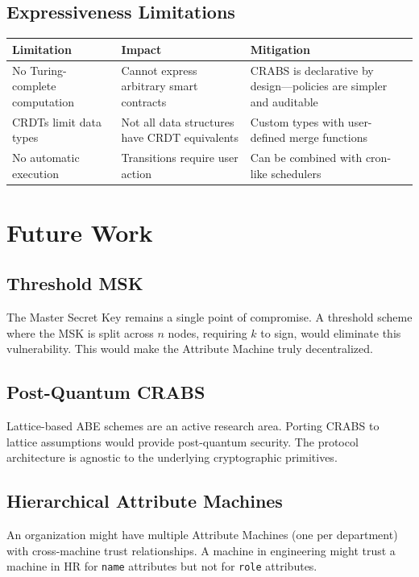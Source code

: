 \documentclass[sigconf,nonacm]{acmart}
\newcommand{\crab}{\textsc{CRABS}}
\begin{document}
\subsection{Expressiveness Limitations}

\vspace{4pt}
\begin{tabularx}{\columnwidth}{l>{\hsize=0.8\hsize}X>{\hsize=1.2\hsize}X}
\toprule
\textbf{Limitation} & \textbf{Impact} & \textbf{Mitigation} \\
\midrule
No Turing-complete computation & Cannot express arbitrary smart contracts & \crab{} is declarative by design---policies are simpler and auditable \\
CRDTs limit data types & Not all data structures have CRDT equivalents & Custom types with user-defined merge functions \\
No automatic execution & Transitions require user action & Can be combined with cron-like schedulers \\
\bottomrule
\end{tabularx}

\section{Future Work}

\subsection{Threshold MSK}

The Master Secret Key remains a single point of compromise. A threshold scheme where the MSK is split across $n$ nodes, requiring $k$ to sign, would eliminate this vulnerability. This would make the Attribute Machine truly decentralized.

\subsection{Post-Quantum \crab{}}

Lattice-based ABE schemes are an active research area. Porting \crab{} to lattice assumptions would provide post-quantum security. The protocol architecture is agnostic to the underlying cryptographic primitives.

\subsection{Hierarchical Attribute Machines}

An organization might have multiple Attribute Machines (one per department) with cross-machine trust relationships. A machine in engineering might trust a machine in HR for \texttt{name} attributes but not for \texttt{role} attributes.
\end{document}
